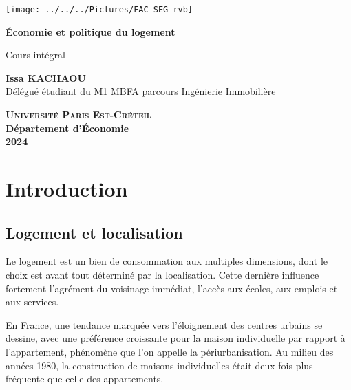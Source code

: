 \documentclass[a4paper, 12pt]{report}
\begin{document}
	
	\begin{titlepage}
		\centering
		\begin{center}
		\texttt{[image: ../../../Pictures/FAC\_SEG\_rvb]}
		\end{center}
		\vspace*{2cm}
		
		\Huge
		
		\textbf{Économie et politique du logement}
		\vspace{1.5cm}
		
		\Large
	Cours intégral
		
		\vspace{2cm}
		
		\textbf{Issa KACHAOU} \\
		{\normalsize Délégué étudiant du M1 MBFA parcours Ingénierie Immobilière}
		
		
		\vfill
		
		\Large
		
		\textsc{\textbf{Université Paris Est-Créteil}}	 \\
		\textbf{Département d'\'Economie} \\
		\textbf{2024}
		
	\end{titlepage}
	\thispagestyle{empty}
	\newpage
	\clearpage
	\mbox{}
	\thispagestyle{empty}
	
	\tableofcontents
	
	\thispagestyle{empty}
	\newpage
	\mbox{}
	\thispagestyle{empty} %
	\chapter*{Introduction}
	
\section{Logement et localisation}

Le logement est un bien de consommation aux multiples dimensions, dont le choix est avant tout déterminé par la localisation. Cette dernière influence fortement l'agrément du voisinage immédiat, l'accès aux écoles, aux emplois et aux services.

En France, une tendance marquée vers l’éloignement des centres urbains se dessine, avec une préférence croissante pour la maison individuelle par rapport à l’appartement, phénomène que l'on appelle la périurbanisation. Au milieu des années 1980, la construction de maisons individuelles était deux fois plus fréquente que celle des appartements.
\end{document}
